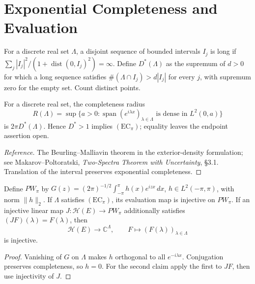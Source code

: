 \section{Exponential Completeness and Evaluation}
\label{v4-arith:w5-j:BDplus}
\begin{definition}
\label{v4-arith:w5-j:def:BM-density}
For a discrete real set \(\Lambda\), a disjoint sequence of bounded
intervals \(I_j\) is long if
\(\sum_j|I_j|^2/(1+\operatorname{dist}(0,I_j)^2)=\infty\).
Define \(D^*(\Lambda)\) as the supremum of \(d>0\) for which a
long sequence satisfies \(\#(\Lambda\cap I_j)>d|I_j|\) for every
\(j\), with supremum zero for the empty set. Count distinct points.
\end{definition}
\begin{theorem}
\label{v4-arith:w5-j:thm:BM-completeness}
For a discrete real set, the completeness radius
\[
 R(\Lambda)=\sup\{a>0:\operatorname{span}(e^{i\lambda x})_{\lambda\in\Lambda}
       \text{ is dense in }L^2(0,a)\}
\]
is \(2\pi D^*(\Lambda)\). Hence \(D^*>1\) implies
\((\mathrm{EC}_\pi)\); equality leaves the endpoint assertion open.
\end{theorem}
\begin{proof}[Reference]
The Beurling--Malliavin theorem in the exterior-density formulation;
see Makarov--Poltoratski, \emph{Two-Spectra Theorem with Uncertainty},
\S3.1. Translation of the interval preserves exponential completeness.
\end{proof}
\begin{proposition}
\label{v4-arith:w5-j:prop:BDplus-reconstruction}
Define \(PW_\pi\) by
\(G(z)=(2\pi)^{-1/2}\int_{-\pi}^\pi h(x)e^{izx}\,dx\),
\(h\in L^2(-\pi,\pi)\), with norm \(\|h\|_2\).
If \(\Lambda\) satisfies \((\mathrm{EC}_\pi)\), its evaluation
map is injective on \(PW_\pi\). If an injective linear map
\(J:\mathcal H(E)\to PW_\pi\) additionally satisfies
\((JF)(\lambda)=F(\lambda)\), then
\begin{equation}
\label{v4-arith:w5-j:eq:sampling-map}
 \mathcal H(E)\longrightarrow\mathbb C^\Lambda,
 \qquad F\longmapsto(F(\lambda))_{\lambda\in\Lambda}
\end{equation}
is injective.
\end{proposition}
\begin{proof}
Vanishing of \(G\) on \(\Lambda\) makes \(h\) orthogonal to
all \(e^{-i\lambda x}\). Conjugation preserves completeness, so
\(h=0\). For the second claim apply the first to \(JF\), then
use injectivity of \(J\).
\end{proof}
